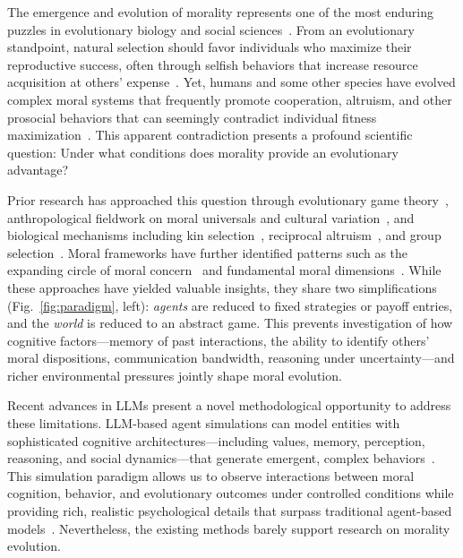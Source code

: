 The emergence and evolution of morality represents one of the most enduring puzzles in evolutionary biology and social sciences~\citep{haidt2007moral, greene2013moral}. From an evolutionary standpoint, natural selection should favor individuals who maximize their reproductive success, often through selfish behaviors that increase resource acquisition at others' expense~\citep{dawkins1976selfish}. Yet, humans and some other species have evolved complex moral systems that frequently promote cooperation, altruism, and other prosocial behaviors that can seemingly contradict individual fitness maximization~\citep{tomasello2016natural}. This apparent contradiction presents a profound scientific question: Under what conditions does morality provide an evolutionary advantage?

Prior research has approached this question through evolutionary game theory~\citep{nowak2006five, axelrod1981evolution}, anthropological fieldwork on moral universals and cultural variation~\citep{henrich2015secret, curry2019good}, and biological mechanisms including kin selection~\citep{hamilton1964genetical}, reciprocal altruism~\citep{trivers1971evolution}, and group selection~\citep{wilson2007rethinking}. Moral frameworks have further identified patterns such as the expanding circle of moral concern~\citep{singer1981expanding} and fundamental moral dimensions~\citep{haidt2007moral}. While these approaches have yielded valuable insights, they share two simplifications (Fig.~\ref{fig:paradigm}, left): \emph{agents} are reduced to fixed strategies or payoff entries, and the \emph{world} is reduced to an abstract game. This prevents investigation of how cognitive factors---memory of past interactions, the ability to identify others' moral dispositions, communication bandwidth, reasoning under uncertainty---and richer environmental pressures jointly shape moral evolution.

Recent advances in LLMs present a novel methodological opportunity to address these limitations. LLM-based agent simulations can model entities with sophisticated cognitive architectures---including values, memory, perception, reasoning, and social dynamics---that generate emergent, complex behaviors~\citep{park2023generative, horton2023large}. This simulation paradigm allows us to observe interactions between moral cognition, behavior, and evolutionary outcomes under controlled conditions while providing rich, realistic psychological details that surpass traditional agent-based models~\citep{aher2023using}.
Nevertheless, the existing methods barely support research on morality evolution.

